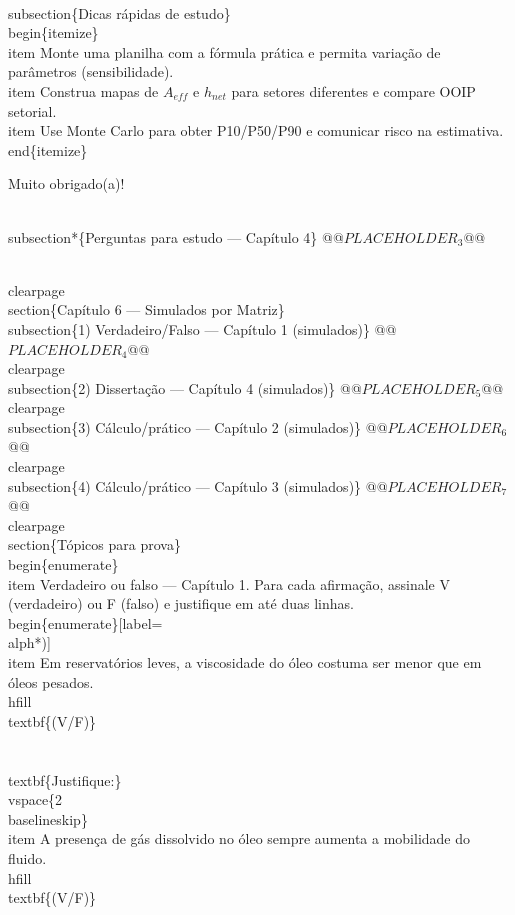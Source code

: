 \documentclass[11pt,a4paper]{article}
\begin{document}
\begin{enumerate}
{\\subsection\{Dicas rápidas de estudo\}
\\begin\{itemize\}
\\item Monte uma planilha com a fórmula prática e permita variação de parâmetros (sensibilidade).
\\item Construa mapas de $A_{eff}$ e $h_{net}$ para setores diferentes e compare OOIP setorial.
\\item Use Monte Carlo para obter P10/P50/P90 e comunicar risco na estimativa.
\\end\{itemize\}


Muito obrigado(a)!

\\subsection*\{Perguntas para estudo --- Capítulo 4\}
@@$PLACEHOLDER_{3}$@@

\\clearpage
\\section\{Capítulo 6 — Simulados por Matriz\}
\\subsection\{1) Verdadeiro/Falso — Capítulo 1 (simulados)\}
@@$PLACEHOLDER_{4}$@@
\\clearpage
\\subsection\{2) Dissertação — Capítulo 4 (simulados)\}
@@$PLACEHOLDER_{5}$@@
\\clearpage
\\subsection\{3) Cálculo/prático — Capítulo 2 (simulados)\}
@@$PLACEHOLDER_{6}$@@
\\clearpage
\\subsection\{4) Cálculo/prático — Capítulo 3 (simulados)\}
@@$PLACEHOLDER_{7}$@@
\\clearpage
\\section\{Tópicos para prova\}
\\begin\{enumerate\}
\\item Verdadeiro ou falso — Capítulo 1. Para cada afirmação, assinale V (verdadeiro) ou F (falso) e justifique em até duas linhas.
\\begin\{enumerate\}[label=\\alph*)]
\\item Em reservatórios leves, a viscosidade do óleo costuma ser menor que em óleos pesados. \\hfill \\textbf\{(V/F)\}\\\\
\\textbf\{Justifique:\} \\vspace\{2\\baselineskip\}
\\item A presença de gás dissolvido no óleo sempre aumenta a mobilidade do fluido. \\hfill \\textbf\{(V/F)\}\\\\
}
\end{enumerate}
\end{document}
